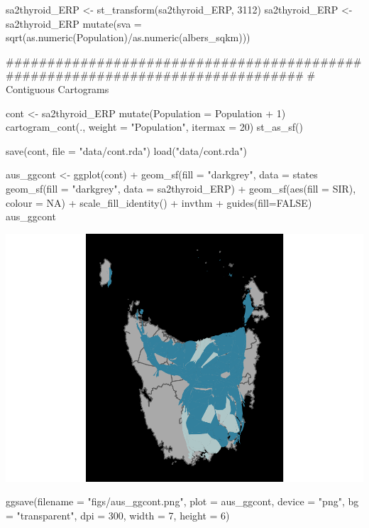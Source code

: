 \begin{Schunk}
\begin{Sinput}
sa2thyroid_ERP <- st_transform(sa2thyroid_ERP, 3112)
sa2thyroid_ERP <- sa2thyroid_ERP %
  mutate(sva = sqrt(as.numeric(Population)/as.numeric(albers_sqkm)))


###############################################################################
# Contiguous Cartograms

cont <- sa2thyroid_ERP %
  mutate(Population = Population + 1) %
  cartogram_cont(., weight = "Population", itermax = 20) %
  st_as_sf()

save(cont, file = "data/cont.rda")
load("data/cont.rda")

aus_ggcont <- ggplot(cont) + 
  geom_sf(fill = "darkgrey",  data = states %
  geom_sf(fill = "darkgrey",  data = sa2thyroid_ERP) +
  geom_sf(aes(fill = SIR), colour = NA) + 
  scale_fill_identity() + 
  invthm + guides(fill=FALSE)
aus_ggcont
\end{Sinput}

\includegraphics{kobakian-cook_files/figure-latex/alternatives-1} \begin{Sinput}
ggsave(filename = "figs/aus_ggcont.png", plot = aus_ggcont,
       device = "png", bg = "transparent", dpi = 300,  width = 7, height = 6)
\end{Sinput}
\end{Schunk}

